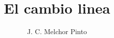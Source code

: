 \documentclass[12pt,addpoints,answers]{guia}
\title{El cambio linea}
\author{J. C. Melchor Pinto}
\begin{document}
\pagestyle{headandfoot}

\INFO

\begin{questions}
    \questionboxed[15] 
    \questionboxed[15] 
    \questionboxed[15] 
\end{questions}
\end{document}
